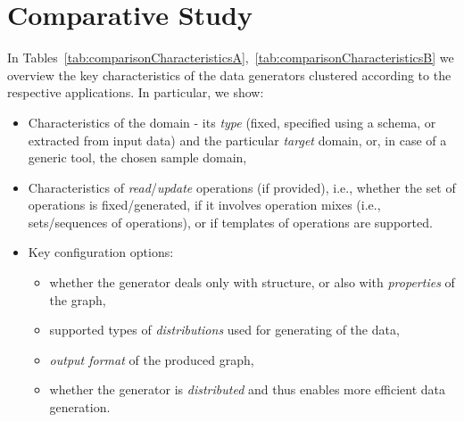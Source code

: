 \section{Comparative Study}
\label{sec:comparison}

In Tables~\ref{tab:comparisonCharacteristicsA},~\ref{tab:comparisonCharacteristicsB}   we overview the key characteristics of the data generators clustered according to the respective applications. In particular, we show:

\begin{itemize}
\item Characteristics of the domain - its \textit{type} (fixed, specified using a schema, or extracted from input data) and the particular \textit{target} domain, or, in case of a generic tool, the chosen sample domain,
\item Characteristics of \textit{read}/\textit{update} operations (if provided), i.e., whether the set of operations is fixed/generated, if it involves operation mixes (i.e., sets/sequences of operations), or if templates of operations are supported.
\item Key configuration options:  
  \begin{itemize}
    \item whether the generator deals only with structure, or also with \textit{properties} of the graph,
    \item supported types of \textit{distributions} used for generating of the data,
    \item \textit{output format} of the produced graph,
    \item  whether the generator is \textit{distributed} and thus enables more efficient data generation.
  \end{itemize}
\end{itemize}   
 
  

